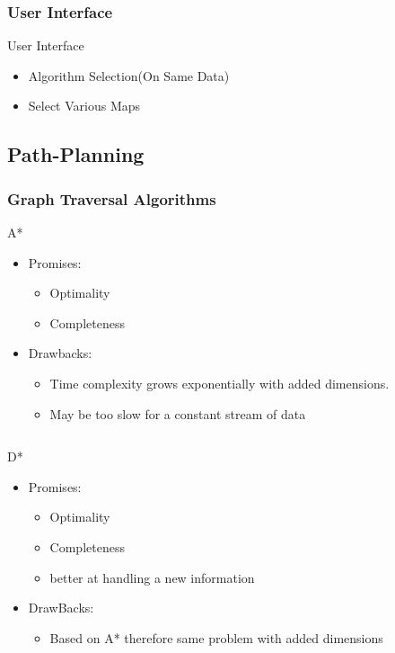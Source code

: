 \documentclass[pdf]{beamer}
\begin{document}
\subsubsection{User Interface}
\begin{frame}{User Interface}
  \begin{itemize}
  \item Algorithm Selection(On Same Data)
  \item Select Various Maps
  \end{itemize}
\end{frame}
\subsection{Path-Planning}
\subsubsection{Graph Traversal Algorithms}
\begin{frame}{A*}
  \begin{itemize}
  \item Promises:
    \begin{itemize}
    \item Optimality
    \item Completeness
    \end{itemize}
  \item Drawbacks:
    \begin{itemize}
    \item Time complexity grows exponentially with added dimensions.
    \item May be too slow for a constant stream of data
    \end{itemize}
  \end{itemize}
  \begin{columns}
  \end{columns}
\end{frame}

\begin{frame}{D*}
  \begin{itemize}
  \item Promises:
    \begin{itemize}
    \item Optimality
      \item Completeness
        \item better at handling a new information
    \end{itemize}
  \item DrawBacks:
    \begin{itemize}
    \item Based on A* therefore same problem with added dimensions
    \end{itemize}
  \end{itemize}
\end{frame}
\end{document}
